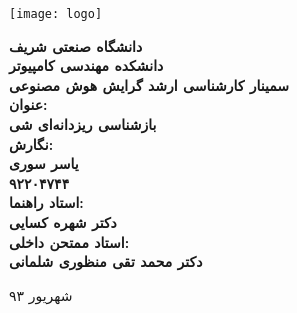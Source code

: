\thispagestyle{empty}
\begin{center}
\texttt{[image: logo]}
\vskip 1cm
{\bf
دانشگاه صنعتی شریف\\ دانشکده مهندسی کامپیوتر\\ سمینار کارشناسی ارشد گرایش هوش مصنوعی\\
\vskip 1cm
عنوان:\\
بازشناسی ریزدانه‌ای شی‬\\
\vskip 1cm
نگارش:\\
یاسر سوری\\
۹۲۲۰۴۷۴۴\\
\vskip 1cm
استاد راهنما:\\
دکتر شهره کسایی\\
\vskip 1cm
استاد ممتحن داخلی:\\
دکتر محمد تقی منظوری شلمانی\\

\vskip 3.5cm

}
شهریور ۹۳
\newpage
\end{center}


